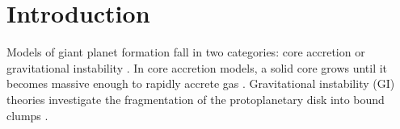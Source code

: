 \documentclass[apj, numberedappendix]{emulateapj}
\begin{document}
\begin{abstract}
\end{abstract}


\section{Introduction}
\label{intro}

Models of giant planet formation fall in two categories:  core accretion or gravitational instability \citep{dangelo11, youdin13}. In core accretion models, a solid core grows until it becomes massive enough to rapidly accrete gas \citep{PerCam74, mizuno78}.  Gravitational instability (GI) theories investigate the fragmentation of the protoplanetary disk into bound clumps \citep{cameron78, boss97}. 
\end{document}
